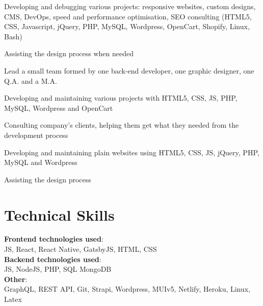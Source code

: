 \documentclass[letterpaper]{algo-resume}
\begin{document}
\begin{minipage}[t]{0.66\textwidth}
\begin{tightitemize}
\item Developing and debugging various projects: responsive websites, custom designs, CMS, DevOps, speed and performance optimisation, SEO consulting (HTML5, CSS, Javascript, jQuery, PHP, MySQL, Wordpress, OpenCart, Shopify, Linux, Bash)
\item Assisting the design process when needed

\end{tightitemize}

\sectionspace 



\begin{tightitemize}
\item Lead a small team formed by one back-end developer, one graphic designer, one Q.A. and a M.A.
\item Developing and maintaining various projects with HTML5, CSS, JS, PHP, MySQL, Wordpress and OpenCart

\end{tightitemize}

\sectionspace 



\begin{tightitemize}
\item Consulting company's clients, helping them get what they needed from the development process
\item Developing and maintaining plain websites using HTML5, CSS, JS, jQuery, PHP, MySQL and Wordpress
\item Assisting the design process

\end{tightitemize}

\sectionspace 




\section{Technical Skills} 

{\bf Frontend technologies used}:\\
\textbullet{} JS, React, React Native, GatsbyJS, HTML,  CSS\\
{\bf Backend technologies used}:\\
\textbullet{} JS, NodeJS, PHP, SQL MongoDB \\
{\bf Other}:\\
\textbullet{} GraphQL, REST API, Git, Strapi,  Wordpress, MUIv5, Netlify, Heroku, Linux, Latex



\sectionspace 



\end{minipage} 
\end{document}
